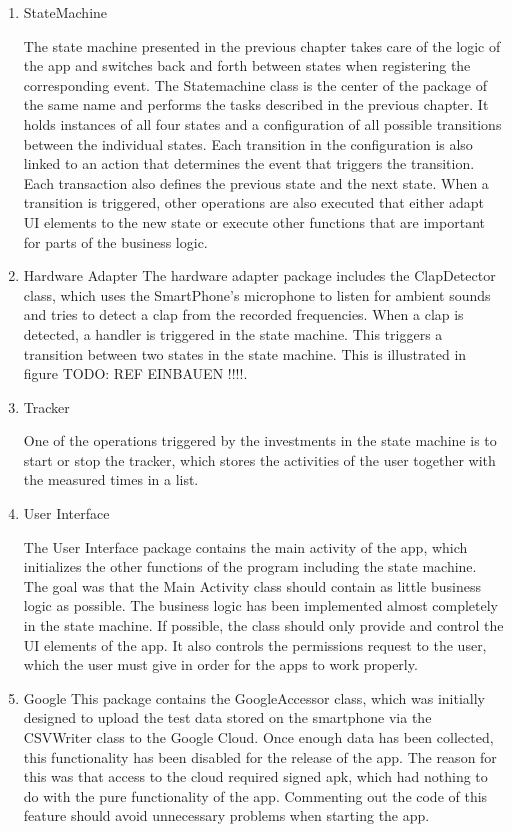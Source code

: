 \documentclass
[
 12pt, %
       DIV12,
       a4paper,
       oneside,
       titlepage,
       parskip=half,
       headings=normal,
       listof=totoc,
       bibliography=totoc,
       index=totoc,
       captions=tableheading,
       ]{scrreprt}
\begin{document}
\begin{enumerate}
\item StateMachine
\label{sec:org9ea54c6}

The state machine presented in the previous chapter takes care of the logic 
of the app and switches back and forth between states when registering the corresponding event. 
The Statemachine class is the center of the package of the same name and performs the tasks described in the previous chapter.
It holds instances of all four states and a configuration of all possible transitions between the individual states.
Each transition in the configuration is also linked to an action that determines the event that triggers 
the transition. Each transaction also defines the previous state and the next state.
When a transition is triggered, other operations are also executed that either adapt UI elements to the new 
state or execute other functions that are important for parts of the business logic.

\item Hardware Adapter
\label{sec:org0a1c43f}
The hardware adapter package includes the ClapDetector class, which uses the SmartPhone's microphone to listen 
for ambient sounds and tries to detect a clap from the recorded frequencies. When a clap is detected, 
a handler is triggered in the state machine. This triggers a transition between two states in the state machine.
This is illustrated in figure TODO: REF EINBAUEN !!!!.

\item Tracker
\label{sec:orgd2cdde2}

One of the operations triggered by the investments in the state machine is to start or stop the tracker, 
which stores the activities of the user together with the measured times in a list.

\item User Interface
\label{sec:org2938786}

The User Interface package contains the main activity of the app, which initializes the other functions of 
the program including the state machine. The goal was that the Main Activity class should contain as little 
business logic as possible. The business logic has been implemented almost completely in the state machine. 
If possible, the class should only provide and control the UI elements of the app. It also controls the permissions 
request to the user, which the user must give in order for the apps to work properly.

\item Google
\label{sec:org3d3dca0}
This package contains the GoogleAccessor class, which was initially designed to upload the test data stored on the 
smartphone via the CSVWriter class to the Google Cloud. Once enough data has been collected, this functionality has 
been disabled for the release of the app. The reason for this was that access to the cloud required signed apk, 
which had nothing to do with the pure functionality of the app. Commenting out the code of this feature should 
avoid unnecessary problems when starting the app.


\end{enumerate}
\end{document}
